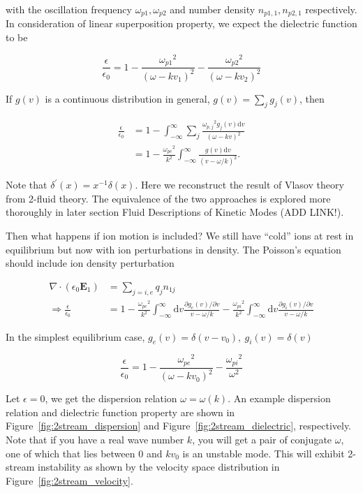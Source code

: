 \documentclass[
  notoc %
]{tufte-book}
\begin{document}
with the oscillation frequency \(\omega_{p1},\omega_{p2}\) and number
density \(n_{p1,1},n_{p2,1}\) respectively. In consideration of linear
superposition property, we expect the dielectric function to be

\[
\frac{\epsilon}{\epsilon_0}=1-\frac{{\omega_{p1}}^2}{(\omega-kv_1)^2}-\frac{{\omega_{p2}}^2}{(\omega-kv_2)^2}
\]

If \(g(v)\) is a continuous distribution in general,
\(g(v)=\sum_j g_j(v)\), then

\[
\begin{aligned}
\frac{\epsilon}{\epsilon_0}&=1-\int_{-\infty}^{\infty}\sum_j \frac{{\omega_{p,j}}^2 g_j(v)\mathrm{d}v}{(\omega-kv)^2} \\ &=1-\frac{{\omega_{pe}}^2}{k^2}\int_{-\infty}^{\infty}\frac{g(v)\mathrm{d}v}{(v-\omega/k)^2}.
\end{aligned}
\]

Note that \(\delta^\prime(x) = x^{-1}\delta(x)\). Here we reconstruct
the result of Vlasov theory from 2-fluid theory. The equivalence of the
two approaches is explored more thoroughly in later section Fluid
Descriptions of Kinetic Modes (ADD LINK!).

Then what happens if ion motion is included? We still have ``cold'' ions
at rest in equilibrium but now with ion perturbations in density. The
Poisson's equation should include ion density perturbation

\[
\begin{aligned}
\nabla\cdot(\epsilon_0 \mathbf{E}_1)&=\sum_{j=i,e} q_j n_{1j} \\
\Rightarrow \frac{\epsilon}{\epsilon_0}&=1-\frac{{\omega_{pe}}^2}{k^2}\int_{-\infty}^{\infty}\mathrm{d}v \frac{\partial g_e(v)/\partial v}{v-\omega/k}-\frac{{\omega_{pi}}^2}{k^2}\int_{-\infty}^{\infty}\mathrm{d}v \frac{\partial g_i(v)/\partial v}{v-\omega/k}
\end{aligned}
\]

In the simplest equilibrium case,
\(g_e(v)=\delta(v-v_0),\ g_i(v)=\delta(v)\)

\[
\frac{\epsilon}{\epsilon_0}=1-\frac{{\omega_{pe}}^2}{(\omega-kv_0)^2}-\frac{{\omega_{pi}}^2}{\omega^2}
\]

Let \(\epsilon=0\), we get the dispersion relation \(\omega=\omega(k)\).
An example dispersion relation and dielectric function property are
shown in Figure~\ref{fig:2stream_dispersion} and
Figure~\ref{fig:2stream_dielectric}, respectively. Note that if you have
a real wave number \(k\), you will get a pair of conjugate \(\omega\),
one of which that lies between \(0\) and \(kv_0\) is an unstable mode.
This will exhibit 2-stream instability as shown by the velocity space
distribution in Figure~\ref{fig:2stream_velocity}.
\end{document}
